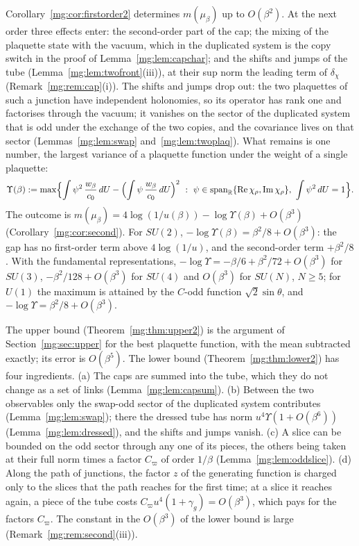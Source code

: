 \documentclass[11pt,a4paper]{article}
\theoremstyle{definition}
\theoremstyle{remark}
\newcommand{\R}{\mathbb{R}}
\newcommand{\dU}{\,dU}
\begin{document}
Corollary~\ref{mg:cor:firstorder2} determines $m(\mu_\beta)$ up to $O(\beta^2)$. At the next order three effects enter: the second-order part of the
cap; the mixing of the plaquette state with the vacuum, which in the duplicated system is the copy switch in the proof of Lemma~\ref{mg:lem:capchar}; and
the shifts and jumps of the tube (Lemma~\ref{mg:lem:twofront}(iii)), at their sup norm the leading term of $\delta_\chi$ (Remark~\ref{mg:rem:cap}(i)).
The shifts and jumps drop out: the two plaquettes of such a junction have independent holonomies, so its operator has rank one and factorises through
the vacuum; it vanishes on the sector of the duplicated system that is odd under the exchange of the two copies, and the covariance lives on that
sector (Lemmas~\ref{mg:lem:swap} and~\ref{mg:lem:twoplaq}). What remains is one number, the largest variance of a plaquette function under the weight
of a single plaquette:
\[
\Upsilon(\beta):=\max\Bigl\{\int\psi^2\,\frac{w_\beta}{c_0}\dU-\Bigl(\int\psi\,\frac{w_\beta}{c_0}\dU\Bigr)^2\ :\ \psi\in\mathrm{span}_\R\{\mathrm{Re}\,\chi_\rho,
\mathrm{Im}\,\chi_\rho\},\ \int\psi^2\dU=1\Bigr\}.
\]
The outcome is $m(\mu_\beta)=4\log(1/u(\beta))-\log\Upsilon(\beta)+O(\beta^3)$ (Corollary~\ref{mg:cor:second}). For $SU(2)$,
$-\log\Upsilon(\beta)=\beta^2/8+O(\beta^3)$: the gap has no first-order term above $4\log(1/u)$, and the second-order term $+\beta^2/8$. With the
fundamental representations, $-\log\Upsilon=-\beta/6+\beta^2/72+O(\beta^3)$ for $SU(3)$, $-\beta^2/128+O(\beta^3)$ for $SU(4)$ and $O(\beta^3)$ for
$SU(N)$, $N\ge5$; for $U(1)$ the maximum is attained by the $C$-odd function $\sqrt2\sin\theta$, and $-\log\Upsilon=\beta^2/8+O(\beta^3)$.

The upper bound (Theorem~\ref{mg:thm:upper2}) is the argument of Section~\ref{mg:sec:upper} for the best plaquette function, with the mean subtracted
exactly; its error is $O(\beta^5)$. The lower bound (Theorem~\ref{mg:thm:lower2}) has four ingredients. (a) The caps are summed into the tube, which
they do not change as a set of links (Lemma~\ref{mg:lem:capsum}). (b) Between the two observables only the swap-odd sector of the duplicated system
contributes (Lemma~\ref{mg:lem:swap}); there the dressed tube has norm $u^4\Upsilon(1+O(\beta^6))$ (Lemma~\ref{mg:lem:dressed}), and the shifts and
jumps vanish. (c) A slice can be bounded on the odd sector through any one of its pieces, the others being taken at their full norm times a
factor $C_\varpi$ of order $1/\beta$ (Lemma~\ref{mg:lem:oddslice}). (d) Along the path of junctions, the factor $z$ of the generating function is charged only to the
slices that the path reaches for the first time; at a slice it reaches again, a piece of the tube costs $C_\varpi u^4(1+\gamma_g)=O(\beta^3)$, which
pays for the factors $C_\varpi$. The
constant in the $O(\beta^3)$ of the lower bound is large (Remark~\ref{mg:rem:second}(iii)).
\end{document}
